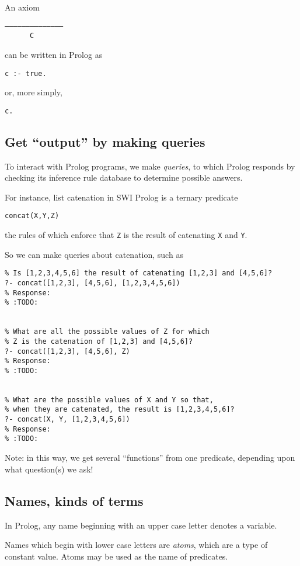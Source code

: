 \documentclass[11pt]{article}
\begin{document}
An axiom
\begin{verbatim}
––––––––––––––
      C
\end{verbatim}
can be written in Prolog as
\begin{verbatim}
c :- true.
\end{verbatim}
or, more simply,
\begin{verbatim}
c.
\end{verbatim}

\subsection{Get “output” by making queries}
\label{sec:org2f342d3}
To interact with Prolog programs, we make \emph{queries}, to which Prolog
responds by checking its inference rule database to determine
possible answers.

For instance, list catenation in SWI Prolog is a ternary predicate
\begin{verbatim}
concat(X,Y,Z)
\end{verbatim}
the rules of which enforce that \texttt{Z} is the result
of catenating \texttt{X} and \texttt{Y}.

So we can make queries about catenation, such as
\begin{verbatim}
% Is [1,2,3,4,5,6] the result of catenating [1,2,3] and [4,5,6]?
?- concat([1,2,3], [4,5,6], [1,2,3,4,5,6])
% Response:
% :TODO:


% What are all the possible values of Z for which
% Z is the catenation of [1,2,3] and [4,5,6]?
?- concat([1,2,3], [4,5,6], Z)
% Response:
% :TODO:


% What are the possible values of X and Y so that,
% when they are catenated, the result is [1,2,3,4,5,6]?
?- concat(X, Y, [1,2,3,4,5,6])
% Response:
% :TODO:
\end{verbatim}

Note: in this way, we get several “functions” from one predicate,
depending upon what question(s) we ask!

\subsection{Names, kinds of terms}
\label{sec:orgf67953e}
In Prolog, any name beginning with an upper case letter
denotes a variable.

Names which begin with lower case letters are \emph{atoms},
which are a type of constant value.
Atoms may be used as the name of predicates.
\end{document}
